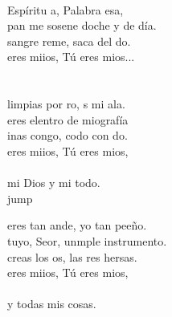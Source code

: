 \begin{cancion}%
	       \\
	Espíritu a, Palabra esa, \\
	pan me sosene doche y de día.\\
	sangre reme, saca del do.\\
	 eres miios, Tú eres mios...\\
	\jump\\
	      \\
	limpias por ro, s mi ala. \\
	 eres elentro de miografía\\
	inas congo,  codo con do.\\
	 eres miios, Tú eres mios,\\
	\jump\\
mi Dios y mi todo.\\jump\\
	\begin{chorus}%
	 eres tan ande, yo  tan peeño. \\
	 tuyo, Seor, unmple instrumento.\\
	 creas los os, las res hersas.  \\
	 eres miios, Tú eres mios,\\
	\jump\\
y todas mis cosas.\\
	\end{chorus}%
	\jump\\
	      \\

\end{cancion}
